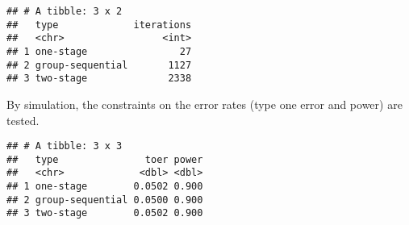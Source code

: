 \documentclass[
]{book}
\newenvironment{Shaded}{\begin{snugshade}}{\end{snugshade}}
\newcommand{\DataTypeTok}[1]{\textcolor[rgb]{0.13,0.29,0.53}{#1}}
\newcommand{\DecValTok}[1]{\textcolor[rgb]{0.00,0.00,0.81}{#1}}
\newcommand{\FloatTok}[1]{\textcolor[rgb]{0.00,0.00,0.81}{#1}}
\newcommand{\KeywordTok}[1]{\textcolor[rgb]{0.13,0.29,0.53}{\textbf{#1}}}
\newcommand{\NormalTok}[1]{#1}
\newcommand{\OperatorTok}[1]{\textcolor[rgb]{0.81,0.36,0.00}{\textbf{#1}}}
\newcommand{\StringTok}[1]{\textcolor[rgb]{0.31,0.60,0.02}{#1}}
\begin{document}
\begin{verbatim}
## # A tibble: 3 x 2
##   type             iterations
##   <chr>                 <int>
## 1 one-stage                27
## 2 group-sequential       1127
## 3 two-stage              2338
\end{verbatim}

By simulation, the constraints on the error rates (type one error and power)
are tested.

\begin{Shaded}
\end{Shaded}

\begin{verbatim}
## # A tibble: 3 x 3
##   type               toer power
##   <chr>             <dbl> <dbl>
## 1 one-stage        0.0502 0.900
## 2 group-sequential 0.0500 0.900
## 3 two-stage        0.0502 0.900
\end{verbatim}
\end{document}

